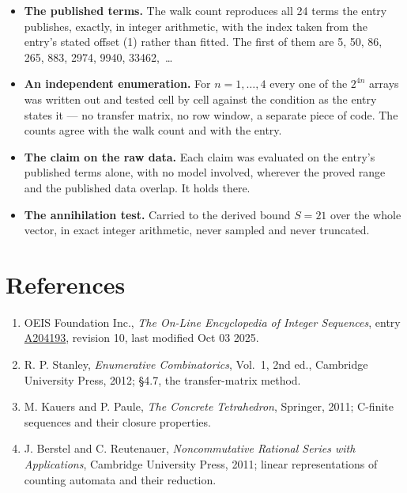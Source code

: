 \documentclass[11pt]{article}
\theoremstyle{definition}
\begin{document}
\begin{itemize}

\item {\bfseries The published terms.} The walk count reproduces all 24 terms the entry publishes, exactly, in integer arithmetic, with the index taken from the entry's stated offset (1) rather than fitted. The first of them are 5, 50, 86, 265, 883, 2974, 9940, 33462,~\dots

\item {\bfseries An independent enumeration.} For $n = 1,\dots,4$ every one of the $2^{4n}$ arrays was written out and tested cell by cell against the condition as the entry states it --- no transfer matrix, no row window, a separate piece of code. The counts agree with the walk count and with the entry.

\item {\bfseries The claim on the raw data.} Each claim was evaluated on the entry's published terms alone, with no model involved, wherever the proved range and the published data overlap. It holds there.

\item {\bfseries The annihilation test.} Carried to the derived bound $S = 21$ over the whole vector, in exact integer arithmetic, never sampled and never truncated.

\end{itemize}

\section{References}

\begin{enumerate}

\item OEIS Foundation Inc., \emph{The On-Line Encyclopedia of Integer Sequences}, entry \href{https://oeis.org/A204193}{A204193}, revision 10, last modified Oct 03 2025.

\item R. P. Stanley, \emph{Enumerative Combinatorics}, Vol.~1, 2nd ed., Cambridge University Press, 2012; \S4.7, the transfer-matrix method.

\item M. Kauers and P. Paule, \emph{The Concrete Tetrahedron}, Springer, 2011; C-finite sequences and their closure properties.

\item J. Berstel and C. Reutenauer, \emph{Noncommutative Rational Series with Applications}, Cambridge University Press, 2011; linear representations of counting automata and their reduction.

\end{enumerate}
\end{document}
